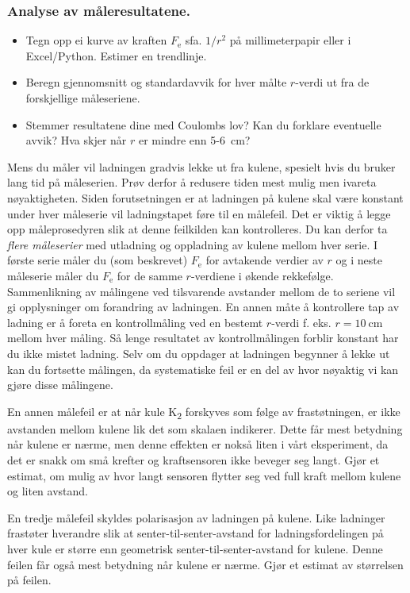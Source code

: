 \documentclass[../Elmag-labhefte-2020.tex]{subfiles}
\begin{document}
\begin{itemize}
\subsubsection{Analyse av måleresultatene.}
\vspace{-4mm} 
\begin{itemize}
    \item Tegn opp ei kurve av kraften $F_\text{e}$ sfa. $1/r^2$ på millimeterpapir eller i Excel/Python. Estimer en trendlinje.
    \item Beregn gjennomsnitt og standardavvik for hver målte $r$-verdi ut fra de forskjellige måleseriene.
    \item Stemmer resultatene dine med Coulombs lov? Kan du forklare eventuelle avvik? Hva skjer når $r$ er mindre enn 5-\SI{6}{\cm}?
\end{itemize}


Mens du måler vil ladningen gradvis lekke ut fra kulene, spesielt hvis du bruker lang tid på måleserien. Prøv derfor å redusere tiden mest mulig men ivareta nøyaktigheten. Siden forutsetningen er at ladningen på kulene skal være konstant under hver måleserie vil ladningstapet føre til en målefeil. Det er viktig å legge opp måleprosedyren slik at denne feilkilden kan kontrolleres. Du kan derfor  ta \emph{flere måleserier} med utladning og oppladning av kulene mellom hver serie. I første serie måler du (som beskrevet) $F_\text{e}$ for avtakende verdier av $r$ og i neste måleserie måler du $F_\text{e}$ for de samme $r$-verdiene i økende rekkefølge. Sammenlikning av målingene ved tilsvarende avstander mellom de to seriene vil gi opplysninger om forandring av ladningen. En annen måte å kontrollere tap av ladning er å foreta en kontrollmåling ved en bestemt $r$-verdi f. eks. $r = \SI{10}{\cm}$ mellom hver måling. Så lenge resultatet av kontrollmålingen forblir konstant har du ikke mistet ladning. Selv om du oppdager at ladningen begynner å lekke ut kan du fortsette målingen, da systematiske feil er en del av hvor nøyaktig vi kan gjøre disse målingene.

En annen målefeil er at når kule K\textsubscript{2} forskyves som følge av frastøtningen, er ikke avstanden mellom kulene lik det som skalaen indikerer. Dette får mest betydning når kulene er nærme, men denne effekten er nokså liten i vårt eksperiment, da det er snakk om små krefter og kraftsensoren ikke beveger seg langt. Gjør et estimat, om mulig av hvor langt sensoren flytter seg ved full kraft mellom kulene og liten avstand. 

En tredje målefeil skyldes polarisasjon av ladningen på kulene. Like ladninger frastøter hverandre slik at senter-til-senter-avstand for ladningsfordelingen på hver kule er større enn geometrisk senter-til-senter-avstand for kulene. Denne feilen får også mest betydning når kulene er nærme. Gjør et estimat av størrelsen på feilen.


\end{itemize}
\end{document}
